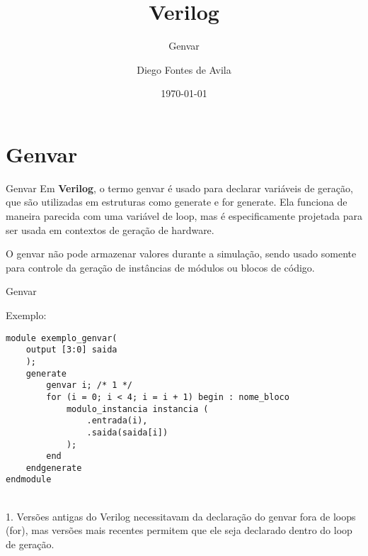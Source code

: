 \documentclass[aspectratio=169,xcolor=dvipsnames]{beamer}
\title{Verilog}
\subtitle{Genvar}
\author{Diego Fontes de Avila}
\institute
{
    Poliware \\
    Escola Politécnica da Universidade de São Paulo %
}
\date{\today} %
\begin{document}
\begin{frame}
    \titlepage
\end{frame}

\section{Genvar}

\begin{frame}[fragile]{Genvar}
Em \textbf{Verilog}, o termo genvar é usado para declarar variáveis de geração, que são utilizadas em estruturas como generate e for generate. Ela funciona de maneira parecida com uma variável de loop, mas é especificamente projetada para ser usada em contextos de geração de hardware.

O genvar não pode armazenar valores durante a simulação, sendo usado somente para controle da geração de instâncias de módulos ou blocos de código.
\end{frame}

\begin{frame}[fragile]{Genvar}
    \begin{block}{Exemplo:}
        \begin{verbatim}
module exemplo_genvar(
    output [3:0] saida
    );
    generate
        genvar i; /* 1 */
        for (i = 0; i < 4; i = i + 1) begin : nome_bloco
            modulo_instancia instancia (
                .entrada(i),
                .saida(saida[i])
            );
        end
    endgenerate
endmodule
        \end{verbatim}
    \end{block}
\text{}\\[-20px]
\tiny {1. Versões antigas do Verilog necessitavam da declaração do genvar fora de loops (for), mas versões mais recentes permitem que ele seja declarado dentro do loop de geração.}
\end{frame}
\end{document}
